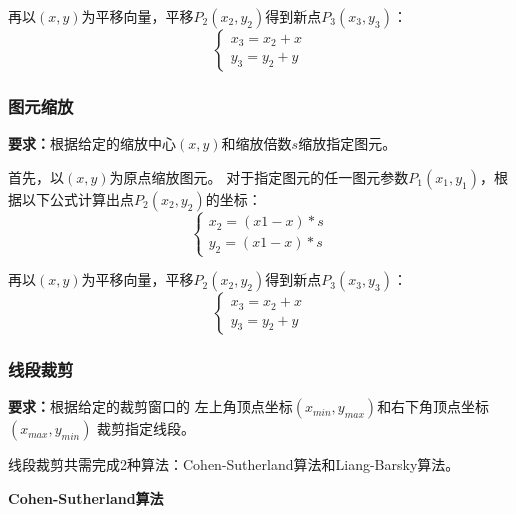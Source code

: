 \documentclass[a4paper,UTF8]{article}
\begin{document}
再以$(x,y)$为平移向量，平移$P_2(x_2,y_2)$得到新点$P_3(x_3,y_3)$：
\begin{equation*}
    \begin{cases}
        x_3=x_2+x\\
        y_3=y_2+y
    \end{cases}
\end{equation*}


\subsubsection{图元缩放}
\textbf{要求：}根据给定的缩放中心$(x,y)$和缩放倍数$s$缩放指定图元。

首先，以$(x,y)$为原点缩放图元。
对于指定图元的任一图元参数$P_1(x_1,y_1)$，根据以下公式计算出点$P_2(x_2,y_2)$的坐标：
\begin{equation*}
    \begin{cases}
        x_2=(x1-x)*s\\
        y_2=(x1-x)*s
    \end{cases}
\end{equation*}

再以$(x,y)$为平移向量，平移$P_2(x_2,y_2)$得到新点$P_3(x_3,y_3)$：
\begin{equation*}
    \begin{cases}
        x_3=x_2+x\\
        y_3=y_2+y
    \end{cases}
\end{equation*}


\subsubsection{线段裁剪}
\textbf{要求：}根据给定的裁剪窗口的
左上角顶点坐标$(x_{min},y_{max})$和右下角顶点坐标$(x_{max},y_{min})$
裁剪指定线段。

线段裁剪共需完成2种算法：Cohen-Sutherland算法和Liang-Barsky算法。

\textbf{Cohen-Sutherland算法}
\end{document}
